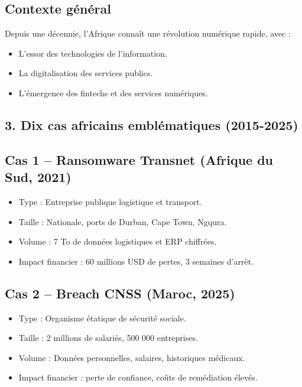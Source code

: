 \documentclass[12pt]{article}
\begin{document}
\begin{center}
\subsection*{Contexte général}
Depuis une décennie, l’Afrique connaît une révolution numérique rapide, avec :  
\begin{itemize}[leftmargin=*, label=\textbullet]
    \item L’essor des technologies de l’information.
    \item La digitalisation des services publics.
    \item L’émergence des fintechs et des services numériques.
\end{itemize}

\subsection*{3. Dix cas africains emblématiques (2015-2025)}

\subsection{Cas 1 – Ransomware Transnet (Afrique du Sud, 2021)}
\begin{itemize}[leftmargin=*, label=\textbullet]
    \item Type : Entreprise publique logistique et transport.
    \item Taille : Nationale, ports de Durban, Cape Town, Ngqura.
    \item Volume : 7 To de données logistiques et ERP chiffrées.
    \item Impact financier : 60 millions USD de pertes, 3 semaines d’arrêt.
\end{itemize}

\subsection{Cas 2 – Breach CNSS (Maroc, 2025)}
\begin{itemize}[leftmargin=*, label=\textbullet]
    \item Type : Organisme étatique de sécurité sociale.
    \item Taille : 2 millions de salariés, 500 000 entreprises.
    \item Volume : Données personnelles, salaires, historiques médicaux.
    \item Impact financier : perte de confiance, coûts de remédiation élevés.
\end{itemize}


\end{center}
\end{document}
